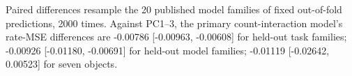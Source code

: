 Paired differences resample the 20 published model families of fixed out-of-fold predictions, 2000 times. Against PC1--3, the primary count-interaction model's rate-MSE differences are -0.00786 [-0.00963, -0.00608] for held-out task families; -0.00926 [-0.01180, -0.00691] for held-out model families; -0.01119 [-0.02642, 0.00523] for seven objects.
